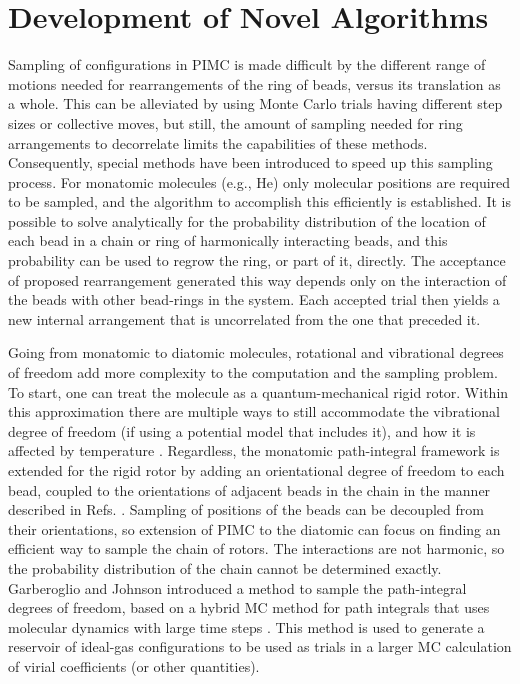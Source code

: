     \section{Development of Novel Algorithms}
    \label{sec:novel algorithms}
        Sampling of configurations in PIMC is made difficult by the different range of motions needed for rearrangements of the ring of beads, versus its translation as a whole. This can be alleviated by using Monte Carlo trials having different step sizes or collective moves, but still, the amount of sampling needed for ring arrangements to decorrelate limits the capabilities of these methods. Consequently, special methods have been introduced to speed up this sampling process. For monatomic molecules (e.g., He) only molecular positions are required to be sampled, and the algorithm \cite{Fosdick:1966vh,Patkowski2008,Shaul2012} to accomplish this efficiently is established. It is possible to solve analytically for the probability distribution of the location of each bead in a chain or ring of harmonically interacting beads, and this probability can be used to regrow the ring, or part of it, directly. The acceptance of proposed rearrangement generated this way depends only on the interaction of the beads with other bead-rings in the system. Each accepted trial then yields a new internal arrangement that is uncorrelated from the one that preceded it.

        Going from monatomic to diatomic molecules, rotational and vibrational degrees of freedom add more complexity to the computation and the sampling problem. To start, one can treat the molecule as a quantum-mechanical rigid rotor. Within this approximation there are multiple ways to still accommodate the vibrational degree of freedom (if using a potential model that includes it), and how it is affected by temperature \cite{Garberoglio2012,Garberoglio2014}. Regardless, the monatomic path-integral framework is extended for the rigid rotor by adding an orientational degree of freedom to each bead, coupled to the orientations of adjacent beads in the chain in the manner described in Refs. \cite{Marx1994,Muser1996,Cui1997,Marx1999}. Sampling of positions of the beads can be decoupled from their orientations, so extension of PIMC to the diatomic can focus on finding an efficient way to sample the chain of rotors.  The interactions are not harmonic, so the probability distribution of the chain cannot be determined exactly. Garberoglio and Johnson \cite{Garberoglio2010} introduced a method to sample the path-integral degrees of freedom, based on a hybrid MC method for path integrals that uses molecular dynamics with large time steps \cite{Tuckerman:1993hu}.  This method is used to generate a reservoir of ideal-gas configurations to be used as trials in a larger MC calculation of virial coefficients (or other quantities).

